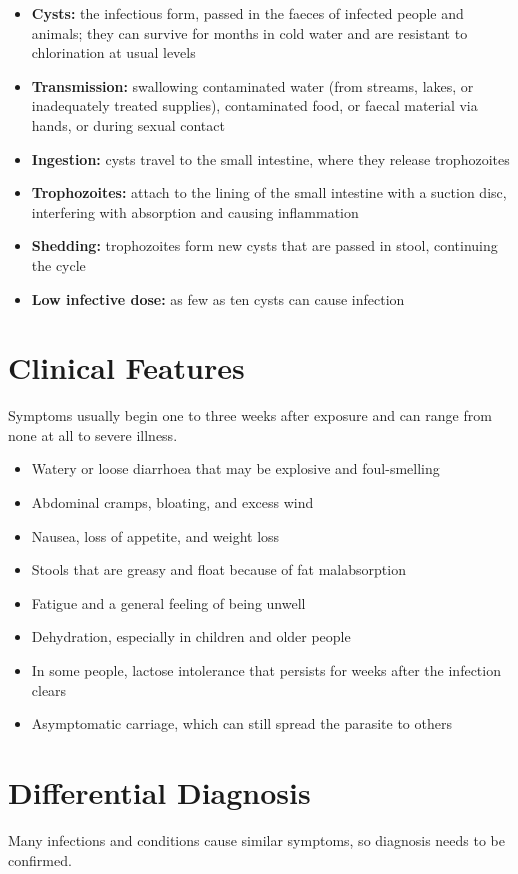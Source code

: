 \begin{itemize}
    \item \textbf{Cysts:} the infectious form, passed in the faeces of infected people and animals; they can survive for months in cold water and are resistant to chlorination at usual levels
    \item \textbf{Transmission:} swallowing contaminated water (from streams, lakes, or inadequately treated supplies), contaminated food, or faecal material via hands, or during sexual contact
    \item \textbf{Ingestion:} cysts travel to the small intestine, where they release trophozoites
    \item \textbf{Trophozoites:} attach to the lining of the small intestine with a suction disc, interfering with absorption and causing inflammation
    \item \textbf{Shedding:} trophozoites form new cysts that are passed in stool, continuing the cycle
    \item \textbf{Low infective dose:} as few as ten cysts can cause infection
\end{itemize}

\section*{Clinical Features}
Symptoms usually begin one to three weeks after exposure and can range from none at all to severe illness.

\begin{itemize}
    \item Watery or loose diarrhoea that may be explosive and foul-smelling
    \item Abdominal cramps, bloating, and excess wind
    \item Nausea, loss of appetite, and weight loss
    \item Stools that are greasy and float because of fat malabsorption
    \item Fatigue and a general feeling of being unwell
    \item Dehydration, especially in children and older people
    \item In some people, lactose intolerance that persists for weeks after the infection clears
    \item Asymptomatic carriage, which can still spread the parasite to others
\end{itemize}

\section*{Differential Diagnosis}
Many infections and conditions cause similar symptoms, so diagnosis needs to be confirmed.


